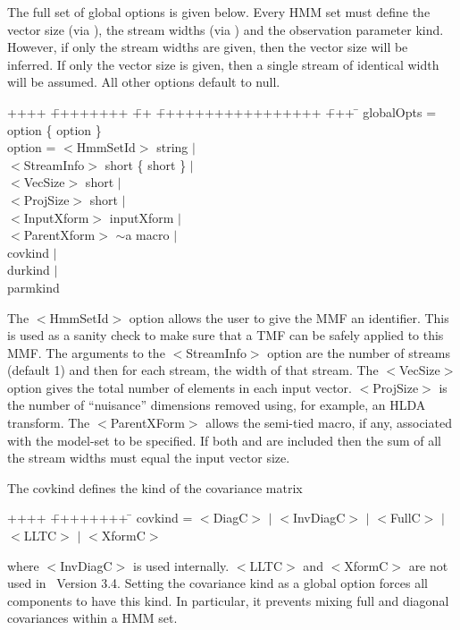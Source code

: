 The full set of global options is given below.  Every HMM set must
define the vector size (via ), the stream widths  
(via )
and the observation parameter kind.  However, if only the stream
widths are given, then the vector size will be inferred.  If
only the vector size is given, then a single stream of identical
width will be assumed.  All other options default to null.
{\sf
\begin{tabbing}
++++ \= ++++++++ \= ++ \= +++++++++++++++++ \= +++ \=  \kill
\> globalOpts = \> option \{ option \} \\
\>  option = \> $<$HmmSetId$>$ string $|$ \\ 
\>\>  $<$StreamInfo$>$ short \{ short \} $|$  \\
\>\>   $<$VecSize$>$    short $|$  \\
\>\>   $<$ProjSize$>$    short $|$  \\
\>\>   $<$InputXform$>$ inputXform $|$  \\
\>\>   $<$ParentXform$>$ $\sim$a macro $|$  \\
\>\>   covkind $|$ \\
\>\>   durkind $|$ \\
\>\>   parmkind 
\end{tabbing}
}
\noindent
The {\sf $<$HmmSetId$>$} option allows the user to give the MMF an
identifier. This is used as a sanity check to make sure that a TMF can
be safely applied to this MMF.
The arguments to the
{\sf $<$StreamInfo$>$} option are the number of streams (default 1) and then
for each stream, the width of that stream.  The {\sf $<$VecSize$>$} option 
gives the total number of elements in each input vector.  {\sf $<$ProjSize$>$}
is the number of ``nuisance'' dimensions removed using, for example, 
an HLDA transform. The {\sf $<$ParentXForm$>$} allows the semi-tied macro,
if any, associated with the model-set to be specified.
If both  and  are included then the
sum of all the stream widths must equal the input vector size.

The {\sf covkind } defines the kind of the covariance matrix
{\sf
\begin{tabbing}
++++ \= ++++++++ \=  \kill
\>  covkind =\> $<$DiagC$>$ $|$ $<$InvDiagC$>$ $|$ $<$FullC$>$ $|$ \\
\>\>            $<$LLTC$>$ $|$ $<$XformC$>$ 
\end{tabbing}
}
\noindent
where {\sf $<$InvDiagC$>$} is used internally.  {\sf $<$LLTC$>$}
and {\sf $<$XformC$>$} are not used in \HTK\ Version 3.4.
Setting the covariance kind as a global option forces all components to
have this kind.  In particular, it prevents mixing full and diagonal covariances
within a HMM set.

